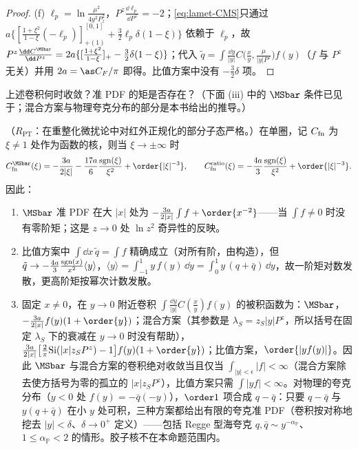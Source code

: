 \begin{proof}
(f) $\ell_p=\ln\frac{\mu^2}{4y^2P_z^2}$，$P^z\frac{\dd\ell_p}{\dd P^z}=-2$；\cref{eq:lamet-CMS}只通过 $a\{[\frac{1+\xi^2}{1-\xi}(-\ell_p)]^{[0,1]}_{+(1)}+\frac32\ell_p\delta(1-\xi)\}$ 依赖于 $\ell_p$，故 $P^z\frac{\dd C^{\MSbar}}{\dd P^z}=2a\{[\frac{1+\xi^2}{1-\xi}]_+-\frac32\delta(1-\xi)\}$；代入 $\tilde q=\int\frac{\dd y}{|y|}C\big(\frac xy,\frac\mu{|y|P^z}\big)f(y)$（$f$ 与 $P^z$ 无关）并用 $2a=\as C_F/\pi$ 即得。比值方案中没有 $-\frac32\delta$ 项。
\end{proof}

上述卷积何时收敛？准 PDF 的矩是否存在？（下面 (iii) 中的 $\MSbar$ 条件已见于\cite{IzubuchiEtAl2018}；混合方案与物理夸克分布的部分是本书给出的推导。）

\begin{proposition}\label{prop:lamet-tails}
（$R_{\mathrm{PT}}$：在重整化微扰论中对红外正规化的部分子态严格。）在单圈，记 $C_{\rm fn}$ 为 $\xi\ne1$ 处作为函数的核，则当 $\xi\to\pm\infty$ 时
\begin{equation}\label{eq:lamet-tails}
C^{\MSbar}_{\rm fn}(\xi)=-\frac{3a}{2|\xi|}-\frac{17a}{6}\frac{{\rm sgn}(\xi)}{\xi^2}+\order{|\xi|^{-3}},\qquad C^{\rm ratio}_{\rm fn}(\xi)=-\frac{4a}{3}\frac{{\rm sgn}(\xi)}{\xi^2}+\order{|\xi|^{-3}}.
\end{equation}%
因此：
\begin{enumerate}[label=(\roman*),leftmargin=2em,itemsep=1pt,topsep=2pt]
\item $\MSbar$ 准 PDF 在大 $|x|$ 处为 $-\frac{3a}{2|x|}\int f+\order{x^{-2}}$——当 $\int f\neq0$ 时没有零阶矩；这是 $z\to0$ 处 $\ln z^2$ 奇异性的反映。
\item 比值方案中 $\int\dd x\,\tilde q=\int f$ 精确成立（对所有阶，由构造），但 $\tilde q\to-\frac{4a}3\frac{{\rm sgn}(x)}{x^2}\langle y\rangle$，$\langle y\rangle=\int_{-1}^1y\,f(y)\,\dd y=\int_0^1y\,(q+\bar q)\,\dd y$，故一阶矩对数发散，更高阶矩按幂次计数发散。
\item 固定 $x\neq0$，在 $y\to0$ 附近卷积 $\int\frac{\dd y}{|y|}C(\frac xy)f(y)$ 的被积函数为：$\MSbar$，$-\frac{3a}{2|x|}f(y)(1+\order{y})$；混合方案（其参数是 $\lambda_S=z_S|y|P^z$，所以括号在固定 $\lambda_S$ 下的衰减在 $y\to0$ 时没有帮助），$\frac{3a}{2|x|}\big[\frac2\pi{\rm Si}(|x|z_SP^z)-1\big]f(y)(1+\order{y})$；比值方案，$\order{|yf(y)|}$。因此 $\MSbar$ 与混合方案的卷积绝对收敛当且仅当 $\int_{|y|<\epsilon}|f|<\infty$（混合方案除去使方括号为零的孤立的 $|x|z_SP^z$），比值方案只需 $\int|yf|<\infty$。对物理的夸克分布（$y<0$ 处 $f(y)=-\bar q(-y)$），$\order1$ 项合成 $q-\bar q$：只要 $q-\bar q$ 与 $y(q+\bar q)$ 在小 $y$ 处可积，三种方案都给出有限的夸克准 PDF（卷积按对称地挖去 $|y|<\delta$、$\delta\to0^+$ 定义）——包括 Regge 型海夸克 $q,\bar q\sim y^{-\alpha_{\mathbb P}}$、$1\le\alpha_{\mathbb P}<2$ 的情形。胶子核不在本命题范围内。
\end{enumerate}
\end{proposition}

